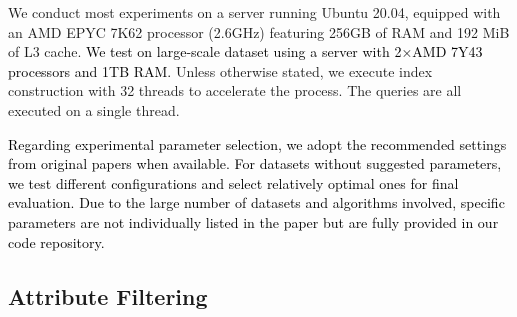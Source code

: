 \documentclass[sigconf, nonacm, pdfa]{acmart}
\begin{document}
{	
	We conduct most experiments on a server running Ubuntu 20.04, equipped with an AMD EPYC 7K62 processor (2.6GHz) featuring 256GB of RAM and 192 MiB of L3 cache. \textcolor{black}{We test on  large-scale dataset using a server with 2×AMD 7Y43 processors and 1TB RAM.}
	Unless otherwise stated, we execute index construction with 32 threads to accelerate the process. The queries are all executed on a single thread. 
	
	\textcolor{black}{
	Regarding experimental parameter selection, we adopt the recommended settings from original papers when available. For datasets without suggested parameters, we test different configurations and select relatively optimal ones for final evaluation. Due to the large number of datasets and algorithms involved, specific parameters are not individually listed in the paper but are fully provided in our code repository.
}
	
	
	\subsection{Attribute Filtering}
	
}
\end{document}
